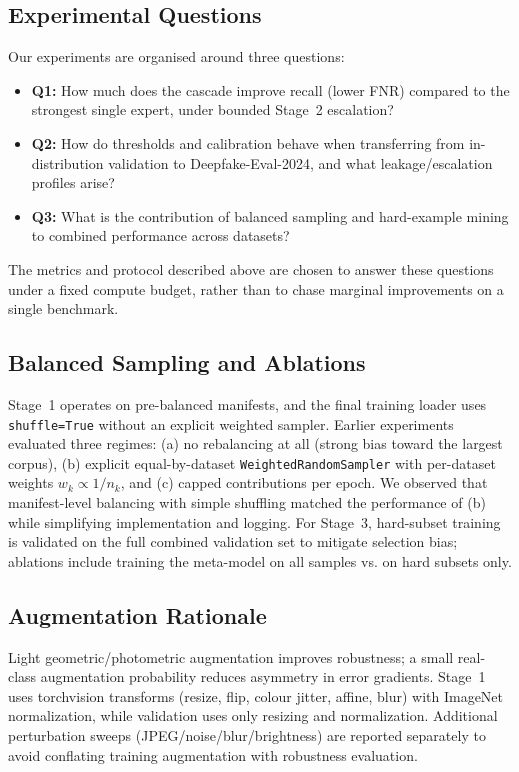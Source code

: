 \subsection*{Experimental Questions}
Our experiments are organised around three questions:
\begin{itemize}[leftmargin=*,itemsep=2pt,parsep=0pt]
  \item \textbf{Q1:} How much does the cascade improve recall (lower FNR) compared to the strongest single expert, under bounded Stage~2 escalation?
  \item \textbf{Q2:} How do thresholds and calibration behave when transferring from in\hyp distribution validation to Deepfake\hyp Eval\hyp 2024, and what leakage/escalation profiles arise?
  \item \textbf{Q3:} What is the contribution of balanced sampling and hard\hyp example mining to combined performance across datasets?
\end{itemize}
The metrics and protocol described above are chosen to answer these questions under a fixed compute budget, rather than to chase marginal improvements on a single benchmark.

\subsection*{Balanced Sampling and Ablations}
Stage~1 operates on pre\hyp balanced manifests, and the final training loader uses \verb|shuffle=True| without an explicit weighted sampler. Earlier experiments evaluated three regimes: (a) no rebalancing at all (strong bias toward the largest corpus), (b) explicit equal\hyp by\hyp dataset \verb|WeightedRandomSampler| with per\hyp dataset weights $w_k\propto 1/n_k$, and (c) capped contributions per epoch. We observed that manifest\hyp level balancing with simple shuffling matched the performance of (b) while simplifying implementation and logging. For Stage~3, hard\hyp subset training is validated on the full combined validation set to mitigate selection bias; ablations include training the meta\hyp model on all samples vs. on hard subsets only.

\FloatBarrier
\subsection*{Augmentation Rationale}
Light geometric/photometric augmentation improves robustness; a small real\hyp class augmentation probability reduces asymmetry in error gradients. Stage~1 uses torchvision transforms (resize, flip, colour jitter, affine, blur) with ImageNet normalization, while validation uses only resizing and normalization. Additional perturbation sweeps (JPEG/noise/blur/brightness) are reported separately to avoid conflating training augmentation with robustness evaluation.
